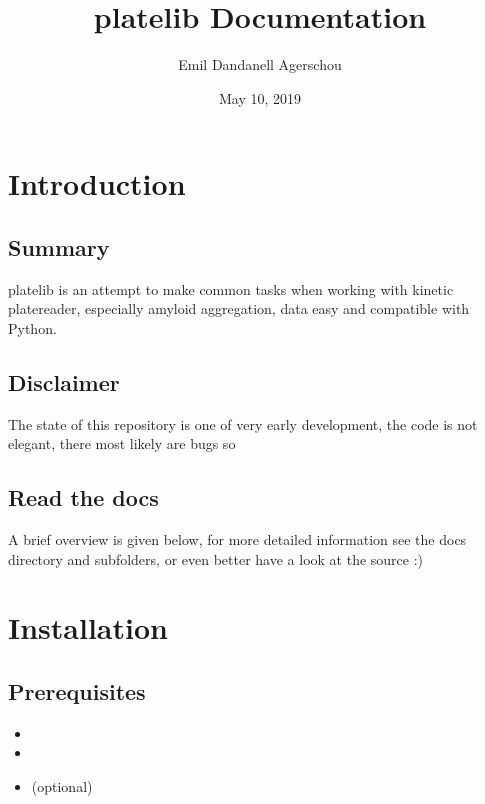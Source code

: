 \documentclass[letterpaper,10pt,english]{sphinxmanual}
\title{platelib Documentation}
\date{May 10, 2019}
\author{Emil Dandanell Agerschou}
\begin{document}
\pagestyle{empty}
\maketitle
\pagestyle{plain}
\sphinxtableofcontents
\pagestyle{normal}
\label{\detokenize{index::doc}}



\chapter{Introduction}
\label{\detokenize{introduction:introduction}}\label{\detokenize{introduction::doc}}

\section{Summary}
\label{\detokenize{introduction:summary}}
platelib is an attempt to make common tasks when working
with kinetic platereader, especially amyloid aggregation,
data easy and compatible with Python.


\section{Disclaimer}
\label{\detokenize{introduction:disclaimer}}
The state of this repository is one of very early development,
the code is not elegant, there most likely are bugs so


\section{Read the docs}
\label{\detokenize{introduction:read-the-docs}}
A brief overview is given below, for more detailed information
see the docs directory and subfolders,
or even better have a look at the source :)


\chapter{Installation}
\label{\detokenize{install:installation}}\label{\detokenize{install::doc}}

\section{Prerequisites}
\label{\detokenize{install:prerequisites}}\begin{itemize}
\item {} 

\item {} 

\item {} 
 (optional)

\end{itemize}
\end{document}

